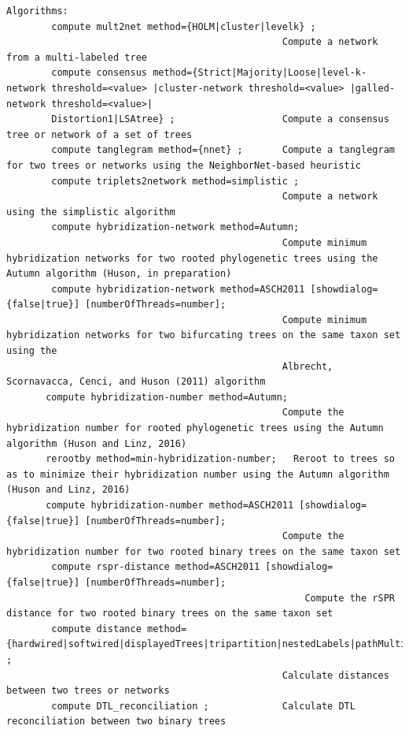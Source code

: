\documentclass[11pt]{article}
\begin{document}
\begin{verbatim}
Algorithms:
        compute mult2net method={HOLM|cluster|levelk} ; 
                                                 Compute a network from a multi-labeled tree
        compute consensus method={Strict|Majority|Loose|level-k-network threshold=<value> |cluster-network threshold=<value> |galled-network threshold=<value>|
        Distortion1|LSAtree} ;                   Compute a consensus tree or network of a set of trees
        compute tanglegram method={nnet} ;       Compute a tanglegram for two trees or networks using the NeighborNet-based heuristic
        compute triplets2network method=simplistic ; 
                                                 Compute a network using the simplistic algorithm
        compute hybridization-network method=Autumn;
                                                 Compute minimum hybridization networks for two rooted phylogenetic trees using the Autumn algorithm (Huson, in preparation)
        compute hybridization-network method=ASCH2011 [showdialog={false|true}] [numberOfThreads=number];
                                                 Compute minimum hybridization networks for two bifurcating trees on the same taxon set using the
                                                 Albrecht, Scornavacca, Cenci, and Huson (2011) algorithm                                         
       compute hybridization-number method=Autumn;
                                                 Compute the hybridization number for rooted phylogenetic trees using the Autumn algorithm (Huson and Linz, 2016)
       rerootby method=min-hybridization-number;   Reroot to trees so as to minimize their hybridization number using the Autumn algorithm (Huson and Linz, 2016)
       compute hybridization-number method=ASCH2011 [showdialog={false|true}] [numberOfThreads=number];   
                                                 Compute the hybridization number for two rooted binary trees on the same taxon set 
        compute rspr-distance method=ASCH2011 [showdialog={false|true}] [numberOfThreads=number];                                               
	                                                 Compute the rSPR distance for two rooted binary trees on the same taxon set 
        compute distance method={hardwired|softwired|displayedTrees|tripartition|nestedLabels|pathMultiplicity} ;     
                                                 Calculate distances between two trees or networks
        compute DTL_reconciliation ;             Calculate DTL reconciliation between two binary trees


\end{verbatim}
\end{document}
